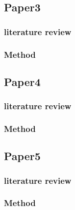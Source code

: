 \documentclass{article}
\begin{document}
  \subsection{Paper3}
    \subsubsection{literature review}
\subsubsection{Method}
  \subsection{Paper4}
    \subsubsection{literature review}
\subsubsection{Method}
  \subsection{Paper5}
    \subsubsection{literature review}
\subsubsection{Method}
  
  
  
\end{document}
